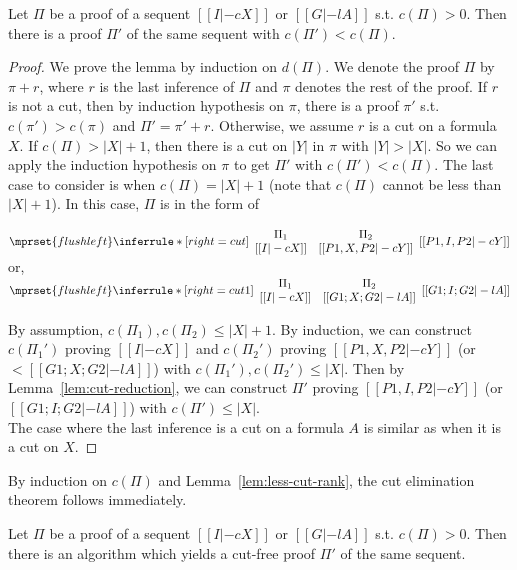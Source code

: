 \begin{lemma}
  \label{lem:less-cut-rank}
  Let $\Pi$ be a proof of a sequent $[[I |-c X]]$ or $[[G |-l A]]$ s.t.
  $c(\Pi)>0$. Then there is a proof $\Pi'$ of the same sequent with
  $c(\Pi')<c(\Pi)$.
\end{lemma}
\begin{proof}
  We prove the lemma by induction on $d(\Pi)$. We denote the proof $\Pi$ by 
  $\pi+r$, where $r$ is the last inference of $\Pi$ and $\pi$ denotes the
  rest of the proof. If $r$ is not a cut, then by induction hypothesis on
  $\pi$, there is a proof $\pi'$ s.t. $c(\pi')>c(\pi)$ and $\Pi'=\pi'+r$.
  Otherwise, we assume $r$ is a cut on a formula $X$. If $c(\Pi)>|X|+1$,
  then there is a cut on $|Y|$ in $\pi$ with $|Y|>|X|$. So we can apply
  the induction hypothesis on $\pi$ to get $\Pi'$ with $c(\Pi')<c(\Pi)$. The
  last case to consider is when $c(\Pi)=|X|+1$ (note that $c(\Pi)$ cannot be
  less than $|X|+1$). In this case, $\Pi$ is in the form of
  \begin{center}
    \scriptsize
    \begin{math}
      $$\mprset{flushleft}
      \inferrule* [right={\tiny cut}] {
        {
          \begin{array}{cc}
            \Pi_1 & \Pi_2 \\
            {[[I |-c X]]} & {[[P1, X, P2 |-c Y]]}
          \end{array}
        }
      }{[[P1, I, P2 |-c Y]]}
    \end{math}
    \qquad\qquad
    or,
    \begin{math}
      $$\mprset{flushleft}
      \inferrule* [right={\tiny cut1}] {
        {
          \begin{array}{cc}
            \Pi_1 & \Pi_2 \\
            {[[I |-c X]]} & {[[G1; X; G2 |-l A]]}
          \end{array}
        }
      }{[[G1; I; G2 |-l A]]}
    \end{math}
  \end{center}
  By assumption, $c(\Pi_1),c(\Pi_2)\leq |X|+1$. By induction, we can
  construct $c(\Pi_1')$ proving $[[I |-c X]]$ and $c(\Pi_2')$ proving
  $[[P1, X, P2 |-c Y]]$ (or $<[[G1; X; G2 |-l A]]$) with
  $c(\Pi_1'), c(\Pi_2')\leq |X|$. Then by Lemma~\ref{lem:cut-reduction}, we
  can construct $\Pi'$ proving $[[P1, I, P2 |-c Y]]$ (or
  $[[G1; I; G2 |-l A]]$) with $c(\Pi')\leq |X|$. \\
  The case where the last inference is a cut on a formula $A$ is similar as
  when it is a cut on $X$.
\end{proof}

By induction on $c(\Pi)$ and Lemma~\ref{lem:less-cut-rank}, the cut
elimination theorem follows immediately.
\begin{theorem}
  Let $\Pi$ be a proof of a sequent $[[I |-c X]]$ or $[[G |-l A]]$ s.t.
  $c(\Pi)>0$. Then there is an algorithm which yields a cut-free proof
  $\Pi'$ of the same sequent.
\end{theorem}
